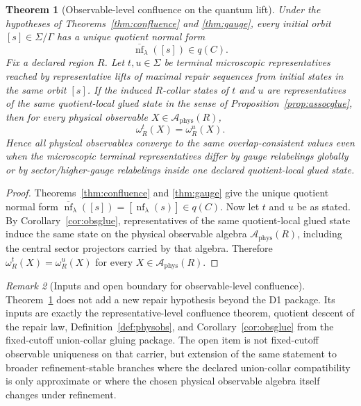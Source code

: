 \documentclass[11pt]{article}
\newtheorem{theorem}{Theorem}[section]
\theoremstyle{remark}
\newtheorem{remark}[theorem]{Remark}
\theoremstyle{plain}
\begin{document}
\begin{theorem}[Observable-level confluence on the quantum lift]\label{thm:obsconfluence}
Under the hypotheses of Theorems~\ref{thm:confluence} and \ref{thm:gauge}, every initial orbit
\([s]\in\Sigma/\Gamma\) has a unique quotient normal form
\[
\overline{\operatorname{nf}}_\lambda([s])\in q(C).
\]
Fix a declared region \(R\). Let \(t,u\in\Sigma\) be terminal microscopic representatives reached
by representative lifts of maximal repair sequences from initial states in the same orbit
\([s]\). If the induced \(R\)-collar states of \(t\) and \(u\) are representatives of the same
quotient-local glued state in the sense of
Proposition~\ref{prop:assocglue}, then for every physical observable
\(X\in\mathcal A_{\mathrm{phys}}(R)\),
\[
\omega_R^t(X)=\omega_R^u(X).
\]
Hence all physical observables converge to the same overlap-consistent values even when the
microscopic terminal representatives differ by gauge relabelings globally or by sector/higher-gauge
relabelings inside one declared quotient-local glued state.
\end{theorem}

\begin{proof}
Theorems~\ref{thm:confluence} and \ref{thm:gauge} give the unique quotient normal form
\(\overline{\operatorname{nf}}_\lambda([s])=[\operatorname{nf}_\lambda(s)]\in q(C)\). Now let
\(t\) and \(u\) be as stated. By Corollary~\ref{cor:obsglue}, representatives of the same
quotient-local glued state induce the same state on the physical observable algebra
\(\mathcal A_{\mathrm{phys}}(R)\), including the central sector projectors carried by that
algebra. Therefore \(\omega_R^t(X)=\omega_R^u(X)\) for every
\(X\in\mathcal A_{\mathrm{phys}}(R)\).
\end{proof}

\begin{remark}[Inputs and open boundary for observable-level confluence]\label{rem:obsconfluence}
Theorem~\ref{thm:obsconfluence} does not add a new repair hypothesis beyond the D1 package. Its
inputs are exactly the representative-level confluence theorem, quotient descent of the repair
law, Definition~\ref{def:physobs}, and Corollary~\ref{cor:obsglue} from the fixed-cutoff
union-collar gluing package. The open item is not fixed-cutoff observable uniqueness on that
carrier, but extension of the same statement to broader refinement-stable branches where the
declared union-collar compatibility is only approximate or where the chosen physical observable
algebra itself changes under refinement.
\end{remark}
\end{document}
